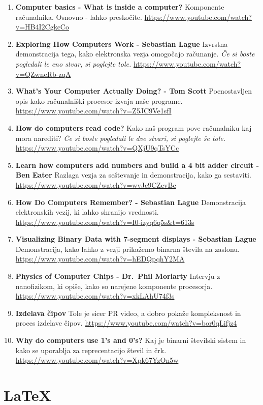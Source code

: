 \documentclass[
]{report}
\begin{document}
\begin{enumerate}
\def\labelenumi{\arabic{enumi}.}
\item
  \textbf{Computer basics - What is inside a computer?}
  Komponente računalnika. Osnovno - lahko preskočite.
  \url{https://www.youtube.com/watch?v=HB4I2CgkcCo}
\item
  \textbf{Exploring How Computers Work - Sebastian Lague}
  Izvrstna demonstracija tega, kako elektronska vezja omogočajo računanje. \emph{Če si boste pogledali le eno stvar, si poglejte tole.}
  \url{https://www.youtube.com/watch?v=QZwneRb-zqA}
\item
  \textbf{What's Your Computer Actually Doing? - Tom Scott}
  Poenostavljen opis kako računalniški procesor izvaja naše programe.
  \url{https://www.youtube.com/watch?v=Z5JC9Ve1sfI}
\item
  \textbf{How do computers read code?}
  Kako naš program pove računalniku kaj mora narediti? \emph{Če si boste pogledali le dve stvari, si poglejte še tole.}
  \url{https://www.youtube.com/watch?v=QXjU9qTsYCc}
\item
  \textbf{Learn how computers add numbers and build a 4 bit adder circuit - Ben Eater}
  Razlaga vezja za seštevanje in demonstracija, kako ga sestaviti.
  \url{https://www.youtube.com/watch?v=wvJc9CZcvBc}
\item
  \textbf{How Do Computers Remember? - Sebastian Lague}
  Demonstracija elektronskih vezij, ki lahko shranijo vrednosti.
  \url{https://www.youtube.com/watch?v=I0-izyq6q5s\&t=613s}
\item
  \textbf{Visualizing Binary Data with 7-segment displays - Sebastian Lague}
  Demonstracija, kako lahko z vezji prikažemo binarna števila na zaslonu.
  \url{https://www.youtube.com/watch?v=hEDQpqhY2MA}
\item
  \textbf{Physics of Computer Chips - Dr.~Phil Moriarty}
  Intervju z nanofizikom, ki opiše, kako so narejene komponente procesorja.
  \url{https://www.youtube.com/watch?v=xkLAhU74f3s}
\item
  \textbf{Izdelava čipov}
  Tole je sicer PR video, a dobro pokaže kompleksnost in proces izdelave čipov.
  \url{https://www.youtube.com/watch?v=bor0qLifjz4}
\item
  \textbf{Why do computers use 1's and 0's?}
  Kaj je binarni številski sistem in kako se uporablja za reprecentacijo števil in črk.
  \url{https://www.youtube.com/watch?v=Xpk67YzOn5w}
\end{enumerate}

\hypertarget{latex}{%
\section{LaTeX}\label{latex}}
\end{document}
